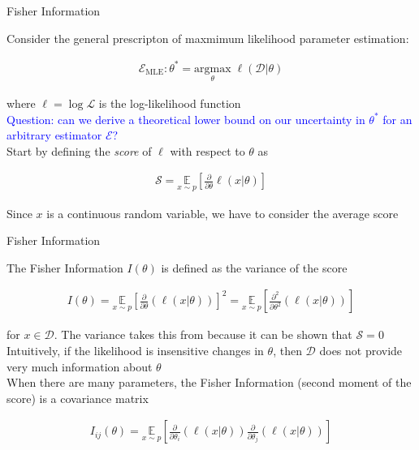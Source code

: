 \documentclass[aspectratio=1610]{beamer}					%
\begin{document}
\begin{frame}{Fisher Information}

Consider the general prescripton of maxmimum likelihood parameter estimation:

\begin{align*}
\mathcal{E}_{\mathrm{MLE}}: \theta^{*} = \underset{\theta}{\mathrm{argmax}}\; \ell(\mathcal{D}|\theta)
\end{align*}

where $\ell = \log\mathcal{L}$ is the log-likelihood function\\
\vspace{0.1in}
\textcolor{blue}{Question: can we derive a theoretical lower bound on our uncertainty in $\theta^{*}$ for an arbitrary estimator $\mathcal{E}$?}\\
\vspace{0.1in}
Start by defining the \emph{score} of $\ell$ with respect to $\theta$ as

\begin{align*}
\mathcal{S} = \underset{{x\sim p}}{\mathbb{E}}\left[\frac{\partial}{\partial\theta} \ell(x|\theta)\right]
\end{align*}

Since $x$ is a continuous random variable, we have to consider the average score

\end{frame}

\begin{frame}{Fisher Information}

The Fisher Information $I(\theta)$ is defined as the variance of the score

\begin{align*}
I(\theta) = \underset{{x\sim p}}{\mathbb{E}}\left[\frac{\partial}{\partial\theta} \left(\ell(x|\theta)\right)\right]^{2} = \underset{{x\sim p}}{\mathbb{E}}\left[\frac{\partial^{2}}{\partial\theta^{2}} \left(\ell(x|\theta)\right)\right]
\end{align*}

for $x\in\mathcal{D}$. The variance takes this from because it can be shown that $\mathcal{S}=0$\\
\vspace{0.1in}
Intuitively, if the likelihood is insensitive changes in $\theta$, then $\mathcal{D}$ does not provide very much information about $\theta$\\

When there are many parameters, the Fisher Information (second moment of the score) is a covariance matrix

\begin{align*}
I_{ij}(\theta) = \underset{{x\sim p}}{\mathbb{E}}\left[\frac{\partial}{\partial\theta_{i}} \left(\ell(x|\theta)\right)\frac{\partial}{\partial\theta_{j}} \left(\ell(x|\theta)\right)\right]
\end{align*}


\end{frame}
\end{document}
